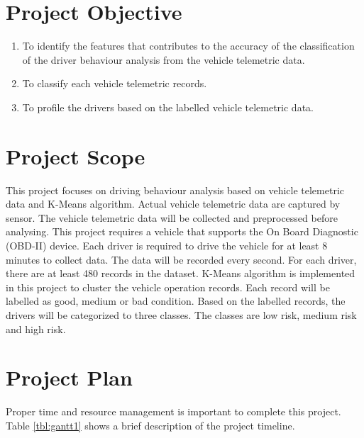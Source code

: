 \section{Project Objective}
\begin{enumerate}
\item To identify the features that contributes to the accuracy of the classification of the driver behaviour analysis from the vehicle telemetric data.
\item To classify each vehicle telemetric records.
\item To profile the drivers based on the labelled vehicle telemetric data.
\end{enumerate}

\section{Project Scope}
This project focuses on driving behaviour analysis based on vehicle telemetric data and K-Means algorithm. Actual vehicle telemetric data are captured by sensor. The vehicle telemetric data will be collected and preprocessed before analysing. This project requires a vehicle that supports the On Board Diagnostic (OBD-II) device. Each driver is required to drive the vehicle for at least 8 minutes to collect data. The data will be recorded every second. For each driver, there are at least 480 records in the dataset. K-Means algorithm is implemented in this project to cluster the vehicle operation records. Each record will be labelled as good, medium or bad condition. Based on the labelled records, the drivers will be categorized to three classes. The classes are low risk, medium risk and high risk. 

\section{Project Plan}
Proper time and resource management is important to complete this project. Table \ref{tbl:gantt1} shows a brief description of the project timeline.

